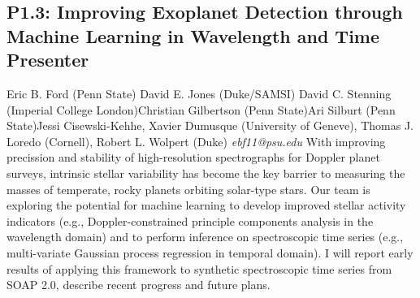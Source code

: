 \documentclass{report}
\begin{document}
\subsection*{P1.3: Improving Exoplanet Detection through Machine Learning in Wavelength and Time Presenter}
\bigskip
Eric B. Ford (Penn State) \newline David E. Jones (Duke/SAMSI) \newline  David C. Stenning (Imperial College London)\newline  Christian Gilbertson (Penn State)\newline Ari Silburt (Penn State)\newline  Jessi Cisewski-Kehhe, Xavier Dumusque (University of Geneve), Thomas J. Loredo (Cornell), Robert L. Wolpert (Duke)\newline\newline
{\it ebf11@psu.edu}\newline
\newline\newline
With improving precission and stability of high-resolution spectrographs for Doppler planet surveys, intrinsic stellar variability has become the key barrier to measuring the masses of temperate, rocky planets orbiting solar-type stars.  Our team is exploring the potential for machine learning to develop improved stellar activity indicators (e.g., Doppler-constrained principle components analysis in the wavelength domain) and to perform inference on spectroscopic time series (e.g., multi-variate Gaussian process regression in temporal domain).  I will report early results of applying this framework to synthetic spectroscopic time series from SOAP 2.0, describe recent progress and future plans.\newline
\newpage
\end{document}
